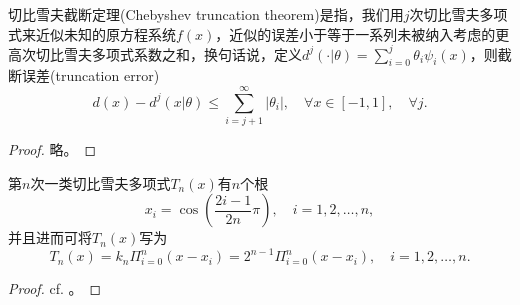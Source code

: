 \begin{subappendices}
\begin{theorem}[切比雪夫截断定理]
  \label{theorem:poly-cheby-truncation-theorem}
  切比雪夫截断定理(Chebyshev truncation theorem)是指，我们用$j$次切比雪夫多项式来近似未知的原方程系统$f(x)$，近似的误差小于等于一系列未被纳入考虑的更高次切比雪夫多项式系数之和，换句话说，定义$d^j(\cdot | \theta) = \sum_{i=0}^{j} \theta_i \psi_i(x)$，则截断误差(truncation error)
  \begin{equation}
    \label{eq:poly-cheby-truncation-theorem}
    d(x) - d^j(x|\theta) \le \sum_{i=j+1}^{\infty} \left| \theta_i \right|, \quad \forall x \in [-1,1], \quad \forall j.
  \end{equation}
\end{theorem}
\begin{proof}
  略。
\end{proof}


\begin{theorem}
  第$n$次一类切比雪夫多项式$T_n(x)$有$n$个根
  \begin{equation}
    \label{eq:poly-cheby-1-roots}
    x_i = \cos \left( \frac{2 i - 1}{2 n } \pi \right), \quad i = 1,2,\ldots, n,
  \end{equation}
  并且进而可将$T_n(x)$写为
  \begin{equation}
    \label{eq:poly-cheby-1-leadcoeff-root}
    T_n(x) = k_n \Pi_{i=0}^{n} \left(x - x_i \right) = 2^{n-1}  \Pi_{i=0}^{n} \left(x - x_i \right) , \quad i=1,2,\ldots,n.
  \end{equation}
\end{theorem}
\begin{proof}
  cf. \cite[p.49]{Boyd:2001wt}。
\end{proof}



\end{subappendices}
